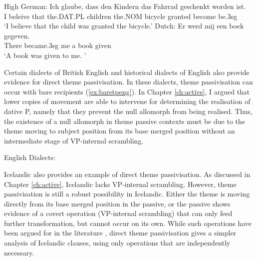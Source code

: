 \begin{exe}
	\ex High German:\label{ex:hg-insitu-sbj}
\gll Ich glaube, dass den Kindern das Fahrrad geschenkt worden ist.\\
I beleive that the.DAT.PL children the.NOM bicycle granted become be.3sg\\
\trans `I believe that the child was granted the bicycle.'
\ex Dutch:\label{ex:dut-insitu-sbj}
\gll Er werd mij een boek gegeven.\\
There became.3sg me a book given\\
\trans `A book was given to me. \cite[pg 245]{Donaldson.2008}'
\end{exe}

Certain dialects of British English and historical dialects of English also provide evidence for direct theme passivisation. In these dialects, theme passivisation can occur with bare recipients (\ref{ex:baretpeng}). In Chapter \ref{ch:active}, I argued that lower copies of movement are able to intervene for determining the realisation of dative P, namely that they prevent the null allomorph from being realised. Thus, the existence of a null allomorph in theme passive contexts must be due to the theme moving to subject position from its base merged position without an intermediate stage of VP-internal scrambling.

\begin{exe}
	\ex English Dialects: \label{ex:eng-directtheme}
		\begin{xlist}
		\end{xlist}
\end{exe}

Icelandic also provides an example of direct theme passivisation. As discussed in Chapter \ref{ch:active}, Icelandic lacks VP-internal scrambling. However, theme passivisation is still a robust possibility in Icelandic. Either the theme is moving directly from its base merged position in the passive, or the passive shows evidence of a covert operation (VP-internal scrambling) that can only feed further transformation, but cannot occur on its own. While such operations have been argued for in the literature \citep[119ff]{Richards.2001}, direct theme passivisation gives a simpler analysis of Icelandic clauses, using only operations that are independently necessary.

